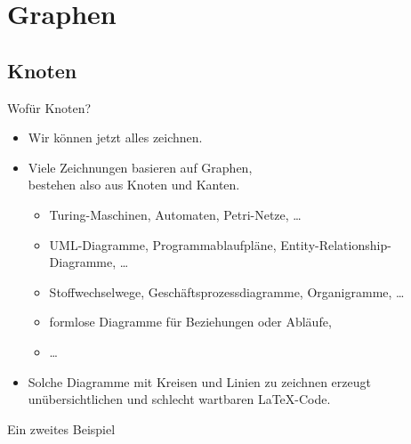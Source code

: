 \section{Graphen}

\subsection{Knoten}

\begin{Frame}{Wofür Knoten?}
  \begin{itemize}
    \item \alert{Wir können jetzt alles zeichnen.}
    \item Viele Zeichnungen basieren auf Graphen,\\
      bestehen also aus Knoten und Kanten.
      \begin{itemize}
        \item Turing-Maschinen, Automaten, Petri-Netze, \dots
        \item UML-Diagramme, Programmablaufpläne, Entity-Relationship-Diagramme, \dots
        \item Stoffwechselwege, Geschäftsprozessdiagramme, Organigramme, \dots
        \item formlose Diagramme für Beziehungen oder Abläufe,
        \item \dots
      \end{itemize}
    \item Solche Diagramme mit Kreisen und Linien zu zeichnen erzeugt
      \alert{unübersichtlichen und schlecht wartbaren} \LaTeX-Code.
  \end{itemize}
\end{Frame}

\begin{Frame}{Ein zweites Beispiel}
\end{Frame}

